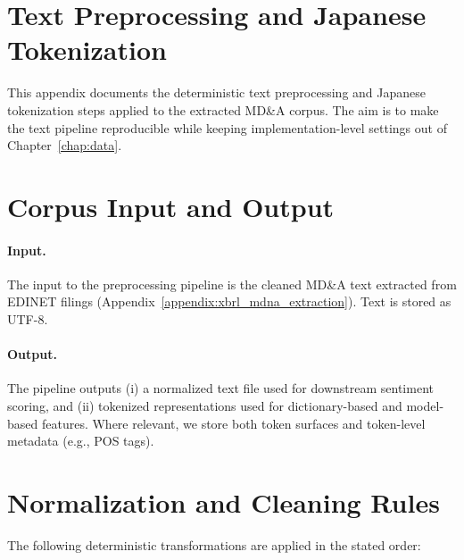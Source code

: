 \section{Text Preprocessing and Japanese Tokenization}
\label{appendix:text_preprocessing}

This appendix documents the deterministic text preprocessing and Japanese tokenization steps applied to the extracted MD\&A corpus. The aim is to make the text pipeline reproducible while keeping implementation-level settings out of Chapter~\ref{chap:data}.

\section{Corpus Input and Output}
\label{appendix:corpus_io}

\paragraph{Input.}
The input to the preprocessing pipeline is the cleaned MD\&A text extracted from EDINET filings (Appendix~\ref{appendix:xbrl_mdna_extraction}). Text is stored as UTF-8.

\paragraph{Output.}
The pipeline outputs (i) a normalized text file used for downstream sentiment scoring, and (ii) tokenized representations used for dictionary-based and model-based features. Where relevant, we store both token surfaces and token-level metadata (e.g., POS tags).

\section{Normalization and Cleaning Rules}
\label{appendix:normalization_rules}

The following deterministic transformations are applied in the stated order:


